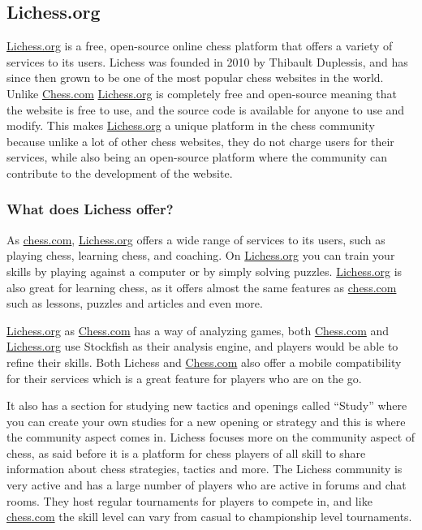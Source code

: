 \subsection{Lichess.org}\label{subsec:lichess-org}

\url{Lichess.org} is a free, open-source online chess platform that offers a variety of services to its users.
Lichess was founded in 2010 by Thibault Duplessis, and has since then grown to be one of the most popular chess websites
in the world.
Unlike \url{Chess.com} \url{Lichess.org} is completely free and open-source meaning that the website is free to use,
and the source
code is available for anyone to use and modify.
This makes \url{Lichess.org} a unique platform in the chess community because unlike a lot of other chess websites,
they do not charge users for their services, while also being an open-source platform where the community can contribute
to the development of the website.

\subsubsection{What does Lichess offer?}\label{subsubsec:what-does-lichess-offer}

As \url{chess.com}, \url{Lichess.org} offers a wide range of services to its users, such as playing chess,
learning chess, and coaching.
On \url{Lichess.org} you can train your skills by playing against a computer or by simply solving puzzles.
\url{Lichess.org} is also great for learning chess, as it offers almost the same features as \url{chess.com}
such as lessons, puzzles and articles and even more.

\url{Lichess.org} as \url{Chess.com} has a way of analyzing games, both \url{Chess.com} and \url{Lichess.org} use Stockfish
as their analysis
engine, and players would be able to refine their skills.
Both Lichess and \url{Chess.com} also offer a mobile compatibility for their services which is a great feature for players
who are on the go.

It also has a section for studying new tactics and openings called “Study” where you can create your own studies for
a new opening or strategy and this is where the community aspect comes in.
Lichess focuses more on the community aspect of chess, as said before it is a platform for chess players of all skill
to share information about chess strategies, tactics and more.
The Lichess community is very active and has a large number of players who are active in forums and chat rooms.
They host regular tournaments for players to compete in, and like \url{chess.com} the skill level can vary
from casual to championship level tournaments.
